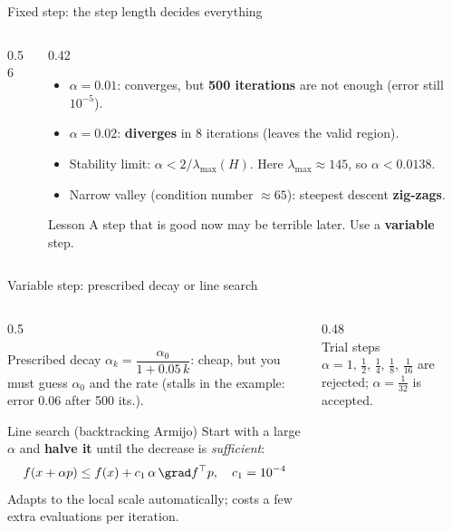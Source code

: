 \begin{frame}{Fixed step: the step length decides everything}
  \begin{columns}[T]
    \begin{column}{0.56\textwidth}
    \end{column}
    \begin{column}{0.42\textwidth}
      \small
      \begin{itemize}
        \item $\alpha=0.01$: converges, but \textbf{500 iterations} are not enough (error still $10^{-5}$).
        \item $\alpha=0.02$: \textbf{diverges} in 8 iterations (leaves the valid region).
        \item Stability limit: $\alpha<2/\lambda_{\max}(H)$. Here $\lambda_{\max}\approx145$, so $\alpha<0.0138$.
        \item Narrow valley (condition number $\approx65$): steepest descent \textbf{zig-zags}.
      \end{itemize}
      \begin{alertblock}{Lesson}
        A step that is good now may be terrible later. Use a \textbf{variable} step.
      \end{alertblock}
    \end{column}
  \end{columns}
\end{frame}

\begin{frame}{Variable step: prescribed decay or line search}
  \begin{columns}[T]
    \begin{column}{0.5\textwidth}
      \begin{block}{Prescribed decay}
        $\alpha_k=\dfrac{\alpha_0}{1+0.05\,k}$: cheap, but you must guess $\alpha_0$ and the rate (stalls in the example: error $0.06$ after 500 its.).
      \end{block}
      \begin{block}{Line search (backtracking Armijo)}
        Start with a large $\alpha$ and \textbf{halve it} until the decrease is \emph{sufficient}:
        \[ f(x+\alpha p)\le f(x)+c_1\,\alpha\,\grad f^\top p,\quad c_1=10^{-4} \]
        Adapts to the local scale automatically; costs a few extra evaluations per iteration.
      \end{block}
    \end{column}
    \begin{column}{0.48\textwidth}
      \\[-2pt]
      \scriptsize Trial steps $\alpha=1,\,\tfrac12,\,\tfrac14,\,\tfrac18,\,\tfrac1{16}$ are rejected; $\alpha=\tfrac1{32}$ is accepted.
    \end{column}
  \end{columns}
\end{frame}

